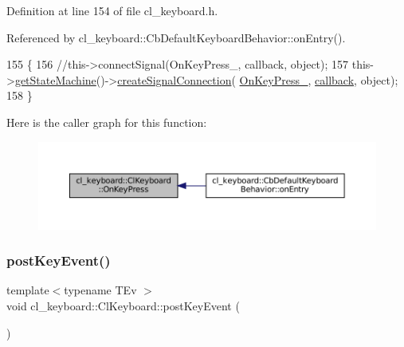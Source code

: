 Definition at line 154 of file cl\+\_\+keyboard.\+h.



Referenced by cl\+\_\+keyboard\+::\+Cb\+Default\+Keyboard\+Behavior\+::on\+Entry().


\begin{DoxyCode}
155         \{
156                 \textcolor{comment}{//this->connectSignal(OnKeyPress\_, callback, object);}
157                 this->\hyperlink{classsmacc_1_1ISmaccClient_aec51d4712404cb9882b86e4c854bb93a}{getStateMachine}()->\hyperlink{classsmacc_1_1ISmaccStateMachine_adf0f42ade0c65cc471960fe2a7c42da2}{createSignalConnection}(
      \hyperlink{classcl__keyboard_1_1ClKeyboard_ae7fb61a86ed9cdd313f0cc1b2661c63c}{OnKeyPress\_}, \hyperlink{servers_2opencv__perception__node_2opencv__perception__node_8cpp_a050e697bd654facce10ea3f6549669b3}{callback}, \textcolor{keywordtype}{object});
158         \}
\end{DoxyCode}
Here is the caller graph for this function\+:
\nopagebreak
\begin{figure}[H]
\begin{center}
\leavevmode
\includegraphics[width=350pt]{classcl__keyboard_1_1ClKeyboard_ae9f4a6dc1ce18397394a432826970baa_icgraph}
\end{center}
\end{figure}
\mbox{\label{classcl__keyboard_1_1ClKeyboard_ac1311ce9a6a64e590df2e1b088f0e733}} 
\subsubsection{\texorpdfstring{post\+Key\+Event()}{postKeyEvent()}}
{\footnotesize\ttfamily template$<$typename T\+Ev $>$ \\
void cl\+\_\+keyboard\+::\+Cl\+Keyboard\+::post\+Key\+Event (\begin{DoxyParamCaption}{ }\end{DoxyParamCaption})\hspace{0.3cm}{\ttfamily [inline]}}



